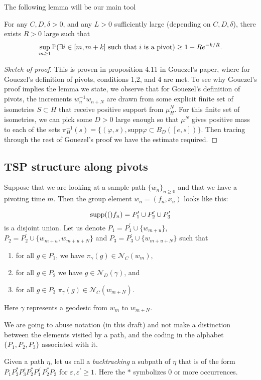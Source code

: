 The following lemma will be our main tool

\begin{lem}
	For any $C, D, \delta>0$, and any $L>0$ sufficiently large (depending on $C,D,\delta$), there exists $R>0$ large such that 
	\[
	\sup_{m\ge 1}\P(\exists i\in [m,m+k]\text{ such that }i\text{ is a pivot})\ge 1-Re^{-k/R}.
	\]
\end{lem}
\begin{proof}[Sketch of proof]
	This is proven in proposition 4.11 in Gouezel's paper, where for Gouezel's definition of pivots, conditions 1,2, and 4 are met. To see why Gouezel's proof implies the lemma we state, we observe that for Gouezel's definition of pivots, the increments $ w _{n} ^{-1} w _{n+N} $ are drawn from some explicit finite set of isometries $ S \subset H $ that receive positive support from $ \mu_{H} ^{N} $. For this finite set of isometries, we can pick some $ D>0 $ large enough so that $ \mu ^{N} $ gives positive mass to each of the sets $ \pi _{H} ^{-1} (s) = \{(\varphi, s), \text{supp} \varphi \subset B _{D} ([e,s])\}$. Then tracing through the rest of Gouezel's proof we have the estimate required. 
\end{proof}

\subsection{TSP structure along pivots}

Suppose that we are looking at a sample path $\{w_n\}_{n\ge 0}$ and that we have a pivoting time $m$. Then the group element $w_n=(f_n,x_n)$ looks like this:

\[\supp(f_n)=P^{\prime}_1\cup P^{\prime}_2\cup P^{\prime}_3\]
is a disjoint union. Let us denote $P_1=P^{\prime}_1\cup\{w_{m+u}\}$, $P_2=P^{\prime}_2\cup \{w_{m+u}, w_{m+u+N}\}$ and  $P_3=P^{\prime}_3\cup \{w_{m+u+N}\}$  such that
\begin{enumerate}
	\item for all $g\in P_1$, we have $\pi_{\gamma}(g)\in \mathcal{N}_{C}(w_m)$,
	\item for all $g\in P_2$ we have $g\in \mathcal{N}_{D}(\gamma)$, and
	\item for all $g\in P_3$ $\pi_{\gamma}(g)\in \mathcal{N}_{C}(w_{m+N})$.
\end{enumerate}
Here $\gamma$ represents a geodesic from $w_m$ to $w_{m+N}$.

We are going to abuse notation (in this draft) and not make a distinction between the elements visited by a path, and the coding in the alphabet $\{P_1,P_2,P_3\}$ associated with it.
\begin{defn}
	Given a path $\eta$, let us call a \emph{backtracking} a subpath of $\eta$ that is of the form $P_1P_2^{*}P_3^{\varepsilon}P_2^{*}P_1^{\varepsilon^{\prime}}P_2^{*}P_3$ for $\varepsilon, \varepsilon^{\prime}\ge 1$. Here the $*$ symbolizes $0$ or more occurrences.
\end{defn}

